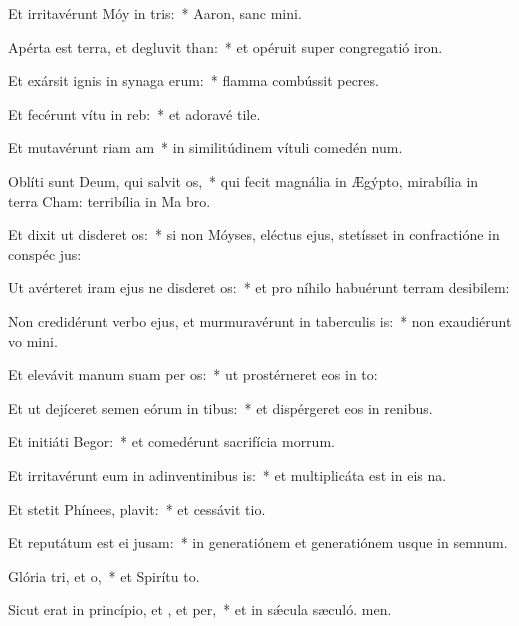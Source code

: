 \item Et irritavérunt Móy in tris:~* Aaron, sanc mini.
\item Apérta est terra, et degluvit than:~* et opéruit super congregatió iron.
\item Et exársit ignis in synaga erum:~* flamma combússit pecres.
\item Et fecérunt vítu in reb:~* et adoravé tile.
\item Et mutavérunt riam am~* in similitúdinem vítuli comedén num.
\item Oblíti sunt Deum, qui salvit os,~* qui fecit magnália in Ægýpto, mirabília in terra Cham: terribília in Ma bro.
\item Et dixit ut disderet os:~* si non Móyses, eléctus ejus, stetísset in confractióne in conspéc jus:
\item Ut avérteret iram ejus ne disderet os:~* et pro níhilo habuérunt terram desibilem:
\item Non credidérunt verbo ejus, et murmuravérunt in taberculis is:~* non exaudiérunt vo mini.
\item Et elevávit manum suam per os:~* ut prostérneret eos in to:
\item Et ut dejíceret semen eórum in tibus:~* et dispérgeret eos in renibus.
\item Et initiáti  Begor:~* et comedérunt sacrifícia morrum.
\item Et irritavérunt eum in adinventinibus is:~* et multiplicáta est in eis na.
\item Et stetit Phínees,  plavit:~* et cessávit tio.
\item Et reputátum est ei  jusam:~* in generatiónem et generatiónem usque in semnum.
\item Glória tri, et o,~* et Spirítu to.
\item Sicut erat in princípio, et , et per,~* et in sǽcula sæculó. men.
